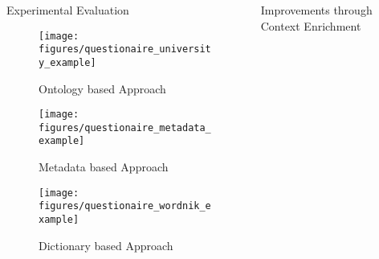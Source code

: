 \documentclass[final,hyperref={pdfpagelabels=true}]{beamer}
\begin{document}
\begin{frame}
\begin{columns}[t, onlytextwidth]
\begin{column}{\textwidth}
\begin{columns}[t, onlytextwidth]
\begin{column}{.49\linewidth}
\begin{block}{Experimental Evaluation}
\begin{minipage}[t][.25\textheight][c]{\textwidth}
\begin{minipage}[t]{\textwidth}
							\begin{minipage}[t]{.45\textwidth}
								\begin{figure}[H]
									 \centering
									 \texttt{[image: figures/questionaire\_university\_example]}
									 \caption{Ontology based Approach}
								\end{figure}
							\end{minipage}
							\begin{minipage}[t]{.45\textwidth}
								\begin{minipage}[t]{\textwidth}
									\begin{figure}[H]
										 \centering
										 \texttt{[image: figures/questionaire\_metadata\_example]}
										 \caption{Metadata based Approach}
									\end{figure}
								\end{minipage}
								\begin{minipage}[t]{\textwidth}
									\vspace{-2.15mm}
									\begin{figure}[H]
									 \centering
									 \texttt{[image: figures/questionaire\_wordnik\_example]}
									 \caption{Dictionary based Approach}
									\end{figure}
								\end{minipage}
							\end{minipage}
						\end{minipage}
					\end{minipage}
				\end{block}
			\end{column}
			\begin{column}{.49\linewidth}
				\begin{block}{Improvements through Context Enrichment}
					\begin{minipage}[t][.25\textheight][c]{\textwidth}
						
					\end{minipage}
				\end{block}
			\end{column}
		\end{columns}
		
    \end{column}

  \end{columns}
\end{frame}
\end{document}
